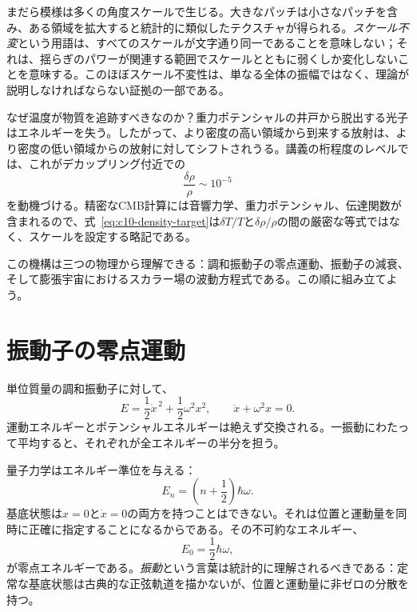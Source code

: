 まだら模様は多くの角度スケールで生じる。大きなパッチは小さなパッチを含み、ある領域を拡大すると統計的に類似したテクスチャが得られる。\emph{スケール不変}という用語は、すべてのスケールが文字通り同一であることを意味しない；それは、揺らぎのパワーが関連する範囲でスケールとともに弱くしか変化しないことを意味する。このほぼスケール不変性は、単なる全体の振幅ではなく、理論が説明しなければならない証拠の一部である。

なぜ温度が物質を追跡すべきなのか？重力ポテンシャルの井戸から脱出する光子はエネルギーを失う。したがって、より密度の高い領域から到来する放射は、より密度の低い領域からの放射に対してシフトされうる。講義の桁程度のレベルでは、これがデカップリング付近での
\begin{equation}
\frac{\delta\rho}{\rho}\sim10^{-5}
\label{eq:c10-density-target}
\end{equation}
を動機づける。精密なCMB計算には音響力学、重力ポテンシャル、伝達関数が含まれるので、式~\eqref{eq:c10-density-target}は\(\delta T/T\)と\(\delta\rho/\rho\)の間の厳密な等式ではなく、スケールを設定する略記である。

\begin{classroomqa}
\end{classroomqa}

この機構は三つの物理から理解できる：調和振動子の零点運動、振動子の減衰、そして膨張宇宙におけるスカラー場の波動方程式である。この順に組み立てよう。

\section{振動子の零点運動}

単位質量の調和振動子に対して、
\begin{equation}
E=\frac12\dot x^{\,2}+\frac12\omega^2x^2,
\qquad
\ddot x+\omega^2x=0.
\label{eq:c10-undamped}
\end{equation}
運動エネルギーとポテンシャルエネルギーは絶えず交換される。一振動にわたって平均すると、それぞれが全エネルギーの半分を担う。

量子力学はエネルギー準位を与える：
\begin{equation}
E_n=\left(n+\frac12\right)\hbar\omega.
\label{eq:c10-oscillator-levels}
\end{equation}
基底状態は\(x=0\)と\(\dot x=0\)の両方を持つことはできない。それは位置と運動量を同時に正確に指定することになるからである。その不可約なエネルギー、
\[
E_0=\frac12\hbar\omega,
\]
が零点エネルギーである。\emph{振動}という言葉は統計的に理解されるべきである：定常な基底状態は古典的な正弦軌道を描かないが、位置と運動量に非ゼロの分散を持つ。

